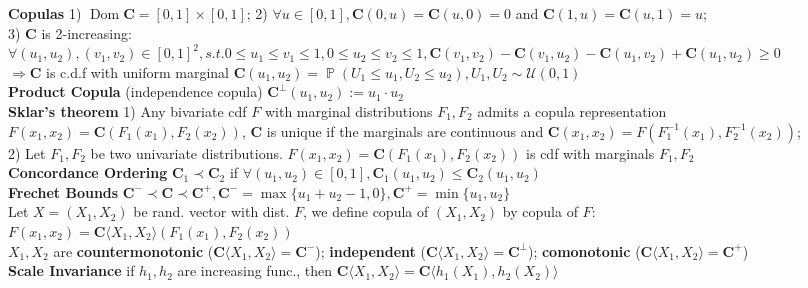 \documentclass[12pt,landscape, a4paper]{article}
\theoremstyle{remark}
\newcommand{\prob}{\operatorname{\mathbb{P}}}
\newcommand{\Dom}{\operatorname{Dom}}
\begin{document}
\begin{multicols*}{3}
\textbf{Copulas} 1) $\Dom \mathbf{C} = [0, 1] \times [0, 1]$; 2) $\forall u \in [0, 1], \mathbf{C}(0, u) = \mathbf{C} (u, 0)=0$ and $\mathbf{C} (1, u) = \mathbf{C}(u, 1) = u$; \\3) $\mathbf{C}$ is 2-increasing: $\forall (u_1, u_2), (v_1, v_2) \in [0, 1]^2, s.t. 0\leq u_1\leq v_1 \leq 1, 0 \leq u_2 \leq v_2 \leq 1, \mathbf{C}(v_1, v_2) - \mathbf{C}(v_1, u_2) - \mathbf{C} (u_1, v_2) + \mathbf{C}(u_1, u_2) \geq 0$ \\
$\Rightarrow\mathbf{C}$ is c.d.f with uniform marginal $\mathbf{C} (u_1, u_2) = \prob (U_1 \leq u_1, U_2 \leq u_2), U_1, U_2 \sim \mathcal{U}(0, 1)$\\
\textbf{Product Copula} (independence copula) $\mathbf{C}^{\bot} (u_1, u_2) := u_1 \cdot u_2$ \\
\textbf{Sklar's theorem} 1) Any bivariate cdf $F$ with marginal distributions $F_1, F_2$ admits a copula representation $F(x_1, x_2) = \mathbf{C} (F_1 (x_1), F_2 (x_2))$, $\mathbf{C}$ is unique if the marginals are continuous and $\mathbf{C} (x_1, x_2) = F(F^{-1}_1 (x_1), F^{-1}_2 (x_2))$;\\
2) Let $F_1, F_2$ be two univariate distributions. $F(x_1, x_2) = \mathbf{C} (F_1 (x_1), F_2 (x_2))$ is cdf with marginals $F_1, F_2$\\
\textbf{Concordance Ordering} $\mathbf{C}_1 \prec \mathbf{C}_2$ if $\forall (u_1, u_2) \in [0, 1], \mathbf{C}_1 (u_1, u_2) \leq \mathbf{C}_2 (u_1, u_2)$\\

\textbf{Frechet Bounds} $\mathbf{C}^{-} \prec \mathbf{C} \prec \mathbf{C}^{+}, \mathbf{C}^{-} = \max \{u_1 +u_2 - 1, 0 \}, \mathbf{C}^{+} = \min\{u_1, u_2\}$\\

Let $X = (X_1, X_2)$ be rand. vector with dist. $F$, we define copula of $(X_1, X_2)$ by copula of $F$: $F(x_1, x_2) = \mathbf{C} \langle X_1, X_2\rangle (F_1 (x_1), F_2 (x_2))$\\

$X_1, X_2$ are \textbf{countermonotonic} ($\mathbf{C} \langle X_1, X_2 \rangle = \mathbf{C}^- $); \textbf{independent} ($\mathbf{C} \langle X_1, X_2 \rangle = \mathbf{C}^\bot$); \textbf{comonotonic} ($\mathbf{C} \langle X_1, X_2 \rangle = \mathbf{C}^+$)\\
\textbf{Scale Invariance} if $h_1, h_2$ are increasing func., then $\mathbf{C} \langle X_1, X_2 \rangle = \mathbf{C} \langle h_1(X_1), h_2(X_2) \rangle$\\


\end{multicols*}
\end{document}
